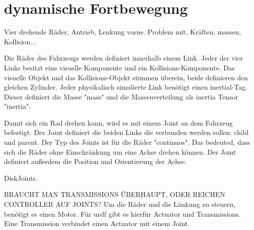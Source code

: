 \section{dynamische Fortbewegung}
Vier drehende Räder, Antrieb, Lenkung vorne.
Problem mit, Kräften, massen, Kollision...

Die Räder des Fahrzeugs werden definiert innerhalb einem Link.
Jeder der vier Links besitzt eine visuelle Komponente und ein Kollisions-Komponente.
Das visuelle Objekt und das Kollisions-Objekt stimmen überein, beide definieren den gleichen Zylinder.
Jeder physikalisch simulierte Link benötigt einen inertial-Tag.
Dieser definiert die Masse "mass" und die Massenverteilung als inertia Tensor "inertia".

Damit sich ein Rad drehen kann, wird es mit einem Joint an dem Fahrzeug befestigt.
Der Joint definiert die beiden Links die verbunden werden sollen: child und parent.
Der Typ des Joints ist für die Räder "continuos". Das bedeuted, dass sich die Räder ohne Einschränkung um eine Achse drehen können.
Der Joint definiert außerdem die Position und Orientierung der Achse.

DiskJoints.

BRAUCHT MAN TRANSMISSIONS ÜBERHAUPT, ODER REICHEN CONTROLLER AUF JOINTS?
Um die Räder und die Länkung zu steuern, benötigt es einen Motor. 
Für urdf gibt es hierfür Actuator und Transmissions.
Eine Transmission verbindet einen Actuator mit einem Joint. 